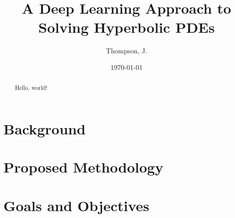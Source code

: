 \documentclass[12pt]{article}
\begin{document}
    \title{
        A Deep Learning Approach to Solving Hyperbolic PDEs\\
    }
    \author{%
        Thompson, J.
    }
    \date{\today}
    \maketitle

    \begin{abstract}
        Hello, world!
    \end{abstract}


    \section{Background}\label{sec:background}

    \section{Proposed Methodology}\label{sec:proposed-methodology}

    \section{Goals and Objectives}\label{sec:goals}

    \pagebreak
    \nocite{*}
    
    
\end{document}
